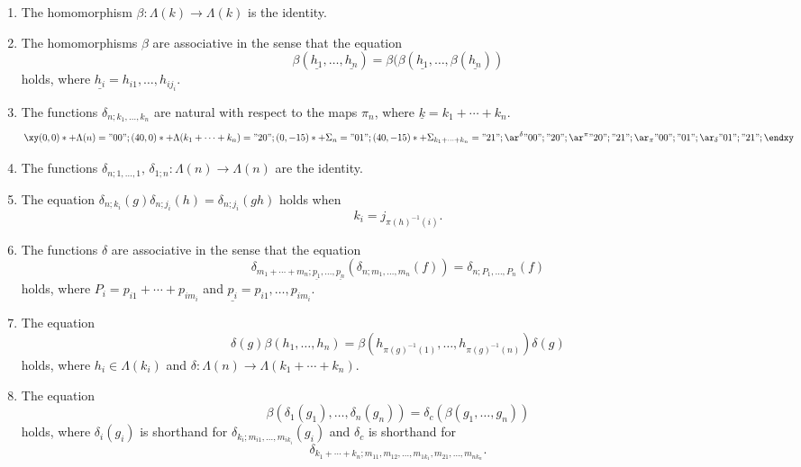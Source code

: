 \documentclass{amsbook} %
\numberwithin{section}{chapter}
\begin{document}
\begin{thm}
\begin{enumerate}
\item\label{eq2} The homomorphism $\beta \colon \Lambda(k) \rightarrow \Lambda(k)$ is the identity.
\item\label{eq3} The homomorphisms $\beta$ are associative in the sense that the equation
\[
  \beta(\underline{h_1},\ldots,\underline{h_n}) = \beta(\beta(\underline{h_1},\ldots,\beta(\underline{h_n}))
\]
holds, where $\underline{h_i} = h_{i1},\ldots,h_{ij_i}$.
\item\label{eq4} The functions $\delta_{n; k_{1}, \ldots, k_{n}}$ are natural with respect to the maps $\pi_{n}$, where $\underline{k} = k_1 + \cdots + k_n$.
  \[
    \xy
      (0,0)*+{\Lambda(n)} ="00";
      (40,0)*+{\Lambda(k_{1} + \cdots + k_{n}) } ="20";
      (0,-15)*+{\Sigma_{n}  } ="01";
      (40,-15)*+{\Sigma_{k_{1} + \cdots + k_{n}} } ="21";
      {\ar^{\delta} "00" ; "20"};
      {\ar^{\pi} "20" ; "21"};
      {\ar_{\pi} "00" ; "01"};
      {\ar_{\delta} "01" ; "21"};
    \endxy
  \]

\item\label{eq5} The functions $\delta_{n; 1, \ldots, 1}, \, \delta_{1;n} \colon \Lambda(n) \rightarrow \Lambda(n)$ are the identity.
\item\label{eq6} The equation $\delta_{n; k_{i}}(g) \delta_{n; j_{i}}(h) = \delta_{n; j_{i}}(gh)$ holds when
  \[
    k_{i} = j_{\pi(h)^{-1}(i)}.
  \]
\item\label{eq7} The functions $\delta$ are associative in the sense that the equation
  \[
    \delta_{m_1 + \cdots + m_n; \underline{p_1},\ldots,\underline{p_n}}\left( \delta_{n; m_{1}, \ldots, m_{n}}(f) \right) = \delta_{n; P_{1}, \ldots, P_{n}}(f)
  \]
holds, where $P_{i} = p_{i1} + \cdots + p_{im_{i}}$ and $\underline{p_i} = p_{i1}, \ldots, p_{im_i}$.
\item\label{eq8} The equation
  \[
    \delta(g) \beta(h_{1}, \ldots, h_{n}) = \beta(h_{\pi(g)^{-1}(1)}, \ldots,  h_{\pi(g)^{-1}(n)}) \delta(g)
  \]
holds, where $h_{i} \in \Lambda(k_{i})$ and $\delta \colon \Lambda(n) \rightarrow \Lambda(k_{1} + \cdots + k_{n})$.
\item\label{eq9} The equation
  \[
    \beta(\delta_{1}(g_{1}), \ldots, \delta_{n}(g_{n})) = \delta_{c}(\beta(g_{1}, \ldots, g_{n}))
  \]
holds, where $\delta_{i}(g_{i})$ is shorthand for $\delta_{k_{i}; m_{i1}, \ldots, m_{ik_{i}}}(g_{i})$ and $\delta_{c}$ is shorthand for
  \[
    \delta_{k_{1}+\cdots + k_{n}; m_{11}, m_{12}, \ldots, m_{1k_{1}}, m_{21}, \ldots, m_{nk_{n}}}.
  \]
\end{enumerate}
\end{thm}
\end{document}

